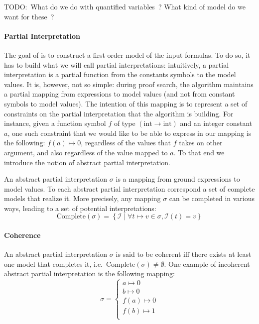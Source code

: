 \documentclass{article}
\begin{document}
TODO:~What do we do with quantified variables~?
What kind of model do we want for these~?

\paragraph{Partial Interpretation}
The goal of \mcsat{} is to construct a first-order model of the input formulas. To do so,
it has to build what we will call partial interpretations: intuitively, a partial
interpretation is a partial function from the constants symbols to the model values.
It is, however, not so simple: during proof search, the \mcsat{} algorithm maintains
a partial mapping from expressions to model values (and not from constant symbols
to model values). The intention of this mapping is to represent a set of constraints
on the partial interpretation that the algorithm is building.
For instance, given a function symbol $f$ of type $(\text{int} \rightarrow \text{int})$ and an
integer constant $a$, one such constraint that we would like to be able to express in
our mapping is the following: $f(a) \mapsto 0$, regardless of the values that $f$ takes on
other argument, and also regardless of the value mapped to $a$. To that end we introduce
the notion of abstract partial interpretation.

An abstract partial interpretation $\sigma$ is a mapping from ground expressions to model values.
To each abstract partial interpretation correspond a set of complete models that realize it.
More precisely, any mapping $\sigma$ can be completed in various ways, leading to a set of
potential interpretations:
\[
  \text{Complete}(\sigma) =
    \left\{
      \mathcal{I}
      \; | \;
      \forall t \mapsto v \in \sigma , \mathcal{I} ( t ) = v
    \right\}
\]

\paragraph{Coherence}
An abstract partial interpretation $\sigma$ is said to be coherent iff
there exists at least one model that completes it,
i.e.~$\text{Complete}(\sigma) \neq \emptyset$. One example
of incoherent abstract partial interpretation is the following
mapping:
\[
  \sigma = \left\{
    \begin{matrix}
      a \mapsto 0 \\
      b \mapsto 0 \\
      f(a) \mapsto 0 \\
      f(b) \mapsto 1 \\
    \end{matrix}
  \right.
\]
\end{document}
